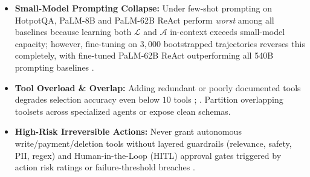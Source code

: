 \documentclass[../../../../master.tex]{subfiles}
\begin{document}
\begin{pitfall}
\begin{itemize}
  \item \textbf{Small-Model Prompting Collapse:} Under few-shot prompting on HotpotQA, PaLM-8B and PaLM-62B ReAct perform \emph{worst} among all baselines because learning both $\mathcal{L}$ and $\mathcal{A}$ in-context exceeds small-model capacity; however, fine-tuning on $3{,}000$ bootstrapped trajectories reverses this completely, with fine-tuned PaLM-62B ReAct outperforming all 540B prompting baselines .
  \item \textbf{Tool Overload \& Overlap:} Adding redundant or poorly documented tools degrades selection accuracy even below $10$ tools ; . Partition overlapping toolsets across specialized agents or expose clean schemas.
  \item \textbf{High-Risk Irreversible Actions:} Never grant autonomous write/payment/deletion tools without layered guardrails (relevance, safety, PII, regex) and Human-in-the-Loop (HITL) approval gates triggered by action risk ratings or failure-threshold breaches .
\end{itemize}
\end{pitfall}
\end{document}
